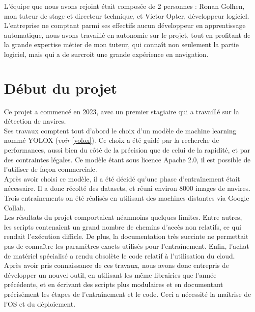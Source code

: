 L'équipe que nous avons rejoint était composée de 2 personnes : Ronan Golhen, mon tuteur de stage et
directeur technique, et Victor Opter, développeur logiciel. L'entreprise ne comptant parmi
ses effectifs aucun développeur en apprentissage automatique, nous avons travaillé en autonomie sur le projet,
tout en profitant de la grande expertise métier de mon tuteur, qui connaît non seulement
la partie logiciel, mais qui a de surcroit une grande expérience en navigation.

\section{Début du projet}

Ce projet a commencé en 2023, avec un premier stagiaire qui a travaillé sur la détection de navires. \\

Ses travaux comptent tout d'abord le choix d'un modèle de machine learning nommé YOLOX
(\textit{voir }\ref{yolox}).
Ce choix a été guidé par la recherche de performances, aussi bien du côté de la précision
que de celui de la rapidité, et par des contraintes légales. Ce modèle étant sous
licence Apache 2.0, il est possible de l'utiliser de façon commerciale.\\

Après avoir choisi ce modèle, il a été décidé qu'une phase d'entraînement était nécessaire.
Il a donc récolté des datasets, et réuni environ 8000 images de navires.
Trois entraînements on été réalisés en utilisant des machines distantes via Google Collab. \\

Les résultats du projet comportaient néanmoins quelques limites. Entre autres, les scripts
contenaient un grand nombre de chemins d'accès non relatifs, ce qui rendait
l'exécution difficle. De plus, la documentation très succinte ne permettait pas
de connaître les paramètres exacts utilisés pour l'entraînement. Enfin, l'achat de matériel
spécialisé a rendu obsolète le code relatif à l'utilisation du cloud.\\

Après avoir pris connaissance de ces travaux, nous avons donc entrepris de développer 
un nouvel outil, en utilisant les même librairies que l'année précédente, 
et en écrivant des scripts plus modulaires et en documentant précisément
les étapes de l'entraînement et le code. Ceci a nécessité la maîtrise de l'OS
et du déploiement. 